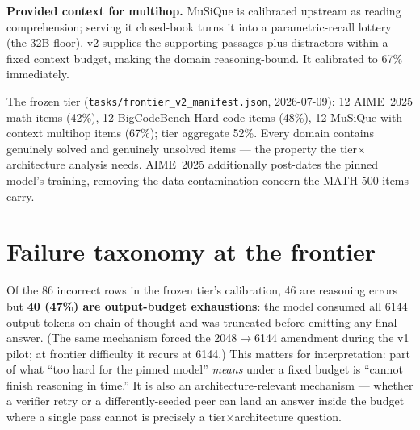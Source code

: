 \documentclass[sigconf,nonacm]{acmart}
\begin{document}
\textbf{Provided context for multihop.} MuSiQue is calibrated upstream as reading
comprehension; serving it closed-book turns it into a parametric-recall lottery (the
32B floor). v2 supplies the supporting passages plus distractors within a fixed
context budget, making the domain reasoning-bound. It calibrated to 67\% immediately.

The frozen tier (\texttt{tasks/frontier\_v2\_manifest.json}, 2026-07-09): 12 AIME~2025
math items (42\%), 12 BigCodeBench-Hard code items (48\%), 12 MuSiQue-with-context
multihop items (67\%); tier aggregate 52\%. Every domain contains genuinely solved and
genuinely unsolved items --- the property the tier$\times$architecture analysis needs.
AIME~2025 additionally post-dates the pinned model's training, removing the
data-contamination concern the MATH-500 items carry.

\section{Failure taxonomy at the frontier}
Of the 86 incorrect rows in the frozen tier's calibration, 46 are reasoning errors but
\textbf{40 (47\%) are output-budget exhaustions}: the model consumed all 6144 output
tokens on chain-of-thought and was truncated before emitting any final answer. (The
same mechanism forced the 2048$\rightarrow$6144 amendment during the v1 pilot; at
frontier difficulty it recurs at 6144.) This matters for interpretation: part of what
``too hard for the pinned model'' \emph{means} under a fixed budget is
``cannot finish reasoning in time.'' It is also an architecture-relevant mechanism ---
whether a verifier retry or a differently-seeded peer can land an answer inside the
budget where a single pass cannot is precisely a tier$\times$architecture question.
\end{document}
